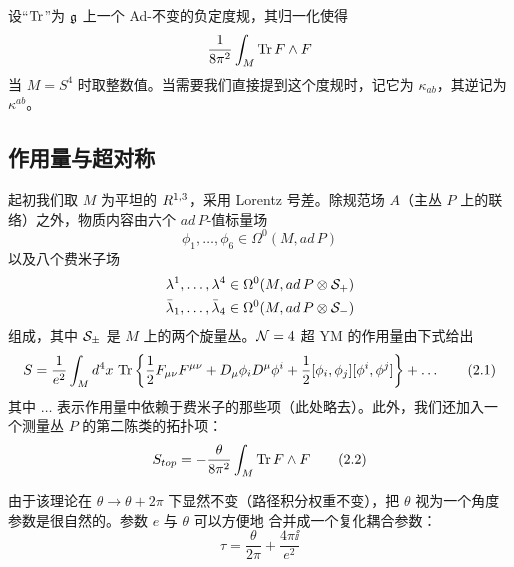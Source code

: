 设“$\operatorname{Tr}$”为 $\mathfrak{g}$ 上一个 Ad-不变的负定度规，其归一化使得
\[ \frac{1}{8\pi^2}\int_M \operatorname{Tr} F\wedge F \]
当 $M=S^4$ 时取整数值。当需要我们直接提到这个度规时，记它为 $\kappa_{ab}$，其逆记为 $\kappa^{ab}$。


\subsection{作用量与超对称}

起初我们取 $M$ 为平坦的 $R^{1,3}$，采用 Lorentz 号差。除规范场 $A$（主丛 $P$ 上的联络）之外，物质内容由六个 $ad\,P$-值标量场
\[ \phi_1,\dots,\phi_6 \in \Omega^0(M, ad\,P) \]
以及八个费米子场
\begin{gather*}
\lambda^1,\dots,\lambda^4 \in \Omega^0(M, ad\,P\otimes\mathcal{S}_+) \\
\bar\lambda_1,\dots,\bar\lambda_4 \in \Omega^0(M, ad\,P\otimes\mathcal{S}_-)
\end{gather*}
组成，其中 $\mathcal{S}_\pm$ 是 $M$ 上的两个旋量丛。$\mathcal{N}=4$ 超 YM 的作用量由下式给出
\begin{equation}
S = \frac{1}{e^2}\int_M d^4x\,\operatorname{Tr}\left\{\frac{1}{2}F_{\mu\nu}F^{\mu\nu} + D_\mu\phi_i D^\mu\phi^i + \frac{1}{2}[\phi_i,\phi_j][\phi^i,\phi^j]\right\} + \ldots \tag{2.1}
\end{equation}
其中 $\ldots$ 表示作用量中依赖于费米子的那些项（此处略去）。此外，我们还加入一个测量丛 $P$ 的第二陈类的拓扑项：
\begin{equation}
S_{top} = -\frac{\theta}{8\pi^2}\int_M \operatorname{Tr} F\wedge F \tag{2.2}
\end{equation}

由于该理论在 $\theta\to\theta+2\pi$ 下显然不变（路径积分权重不变），把 $\theta$ 视为一个角度参数是很自然的。参数 $e$ 与 $\theta$ 可以方便地
合并成一个复化耦合参数：
\[ \tau = \frac{\theta}{2\pi} + \frac{4\pi\ii}{e^2} \]


